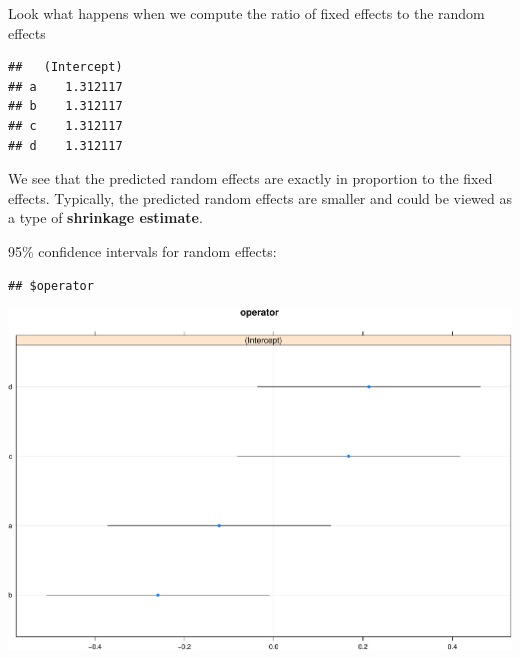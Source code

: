 \documentclass[
  ignorenonframetext,
]{beamer}
\newenvironment{Shaded}{\begin{snugshade}}{\end{snugshade}}
\newcommand{\DecValTok}[1]{\textcolor[rgb]{0.00,0.00,0.81}{#1}}
\newcommand{\DocumentationTok}[1]{\textcolor[rgb]{0.56,0.35,0.01}{\textbf{\textit{#1}}}}
\newcommand{\FunctionTok}[1]{\textcolor[rgb]{0.00,0.00,0.00}{#1}}
\newcommand{\NormalTok}[1]{#1}
\newcommand{\SpecialCharTok}[1]{\textcolor[rgb]{0.00,0.00,0.00}{#1}}
\begin{document}
\begin{frame}[fragile]{}
\protect\hypertarget{section-8}{}
Look what happens when we compute the ratio of fixed effects to the
random effects

\vspace{12pt}

\begin{Shaded}
\end{Shaded}

\begin{verbatim}
##   (Intercept)
## a    1.312117
## b    1.312117
## c    1.312117
## d    1.312117
\end{verbatim}

\vspace{12pt}

We see that the predicted random effects are exactly in proportion to
the fixed effects. Typically, the predicted random effects are smaller
and could be viewed as a type of \textbf{shrinkage estimate}.
\end{frame}

\begin{frame}[fragile]{}
\protect\hypertarget{section-9}{}
95\% confidence intervals for random effects:

\vspace{12pt}
\tiny

\begin{verbatim}
## $operator
\end{verbatim}

\includegraphics{week11p1_files/figure-beamer/95CI-1.pdf}
\end{frame}
\end{document}
